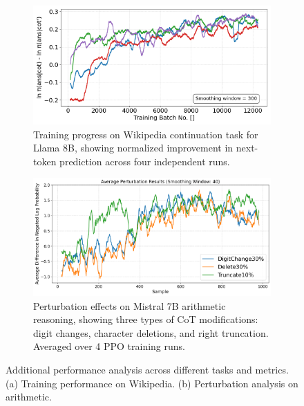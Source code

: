 \documentclass{article} %
\begin{document}
\begin{figure}[ht]
    \centering
    \begin{subfigure}[b]{0.49\textwidth}
        \centering
        \includegraphics[width=\textwidth]{Figures/combined_metrics_wiki_continuation.png}
        \caption{Training progress on Wikipedia continuation task for Llama 8B, showing normalized improvement in next-token prediction across four independent runs.}
        \label{fig:wikiloss}
    \end{subfigure}
    \hfill
    \begin{subfigure}[b]{0.49\textwidth}
        \centering
        \includegraphics[width=\textwidth]{Figures/average_perturbation_results_plot_smooth40.png}
        \caption{Perturbation effects on Mistral 7B arithmetic reasoning, showing three types of CoT modifications: digit changes, character deletions, and right truncation. Averaged over 4 PPO training runs.}
        \label{fig:faith_mistral}
    \end{subfigure}
    
    \vspace{1em}
    
    \caption{Additional performance analysis across different tasks and metrics. (a) Training performance on Wikipedia. (b) Perturbation analysis on arithmetic.}
    \label{fig:additional_analysis}
\end{figure}
\end{document}
